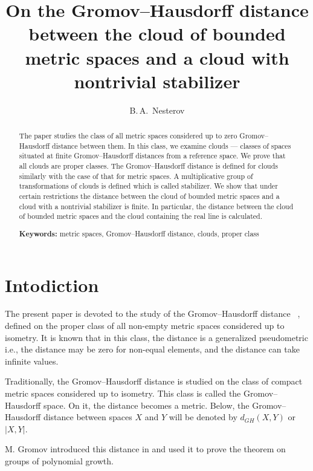 \documentclass[leqno]{article}
\begin{document}
\title{On the Gromov--Hausdorff distance between the cloud of bounded
metric spaces and a cloud with nontrivial stabilizer}
\author{B.\,A.~Nesterov}
\date{}
\maketitle

\begin{abstract}
    The paper studies the class of all metric spaces considered up to
    zero Gromov--Hausdorff distance between them. In this class, we
    examine clouds --- classes of spaces situated at finite
    Gromov--Hausdorff distances from a reference space. We prove that
    all clouds are proper classes. The Gromov--Hausdorff distance is
    defined for clouds similarly with the case of that for metric
    spaces. A multiplicative group of transformations of clouds is
    defined which is called stabilizer.%
    We show that under certain restrictions the distance between the
    cloud of bounded metric spaces and a cloud with a nontrivial
    stabilizer is finite. In particular, the distance between the cloud
    of bounded metric spaces and the cloud containing the real line
    is calculated.

    {\bf Keywords:} metric spaces, Gromov--Hausdorff distance, clouds,
    proper class
\end{abstract}

\section{Intodiction}

The present paper is devoted to the study of the Gromov--Hausdorff
distance ~\cite{Edwards, Gromov81, Gromov99},
defined on the proper class of all non-empty metric spaces considered
up to isometry. It is known that in this class, the distance is a
generalized pseudometric i.e., the distance may be zero for non-equal
elements, and the distance can take infinite values.

Traditionally, the Gromov--Hausdorff distance is studied on the class
of compact metric spaces considered up to isometry. This class is
called the Gromov--Hausdorff space. On it, the distance becomes a
metric. Below, the Gromov--Hausdorff distance between spaces $ X $
and $ Y $ will be denoted by $ d_{GH}(X, Y) $ or $ |X, Y| $.

M. Gromov introduced this distance in \cite{Gromov81} and used it to
prove the theorem on groups of polynomial growth.
\end{document}
